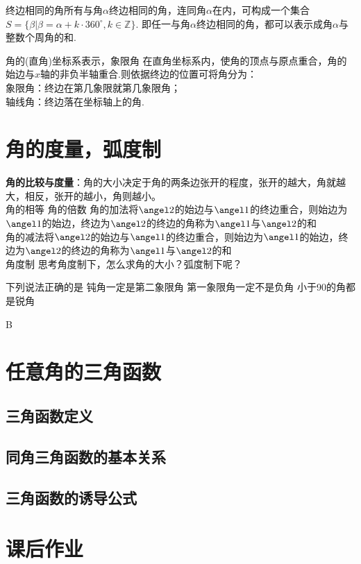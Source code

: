 {终边相同的角}所有与角$\alpha$终边相同的角，连同角$\alpha$在内，可构成一个集合
$S=\{\beta|\beta=\alpha+k\cdot 360^\circ,k\in\mathbb{Z}\}$.%
即任一与角$\alpha$终边相同的角，都可以表示成角$\alpha$与整数个周角的和.
\par
{角的(直角)坐标系表示，象限角}
在直角坐标系内，使角的顶点与原点重合，角的始边与$x$轴的非负半轴重合.则依据终边的位置可将角分为：\\
{\kaishu 象限角}：终边在第几象限就第几象限角；\\
{\kaishu 轴线角}：终边落在坐标轴上的角.\\

\section{角的度量，弧度制}
{\bf 角的比较与度量}：角的大小决定于角的两条边张开的程度，张开的越大，角就越大，相反，张开的越小，角则越小。\\
{角的相等}
{角的倍数}
{角的加法}将$\angel 2$的始边与$\angel 1$的终边重合，则始边为$\angel 1$的始边，终边为$\angel 2$的终边的角称为$\angel 1$与$\angel 2$的和\\
{角的减法}将$\angel 2$的始边与$\angel 1$的终边重合，则始边为$\angel 1$的始边，终边为$\angel 2$的终边的角称为$\angel 1$与$\angel 2$的和\\
{角度制}
{思考}角度制下，怎么求角的大小？弧度制下呢？

\startexercise
\begin{exercise}
\item
下列说法正确的是\xz
{}
{钝角一定是第二象限角}
{第一象限角一定不是负角}
{小于90\degree 的角都是锐角}
\begin{answer}B\end{answer}




\end{exercise}
\stopexercise

\section{任意角的三角函数}
\subsection{三角函数定义}
\subsection{同角三角函数的基本关系}
\subsection{三角函数的诱导公式}



\section{课后作业}

